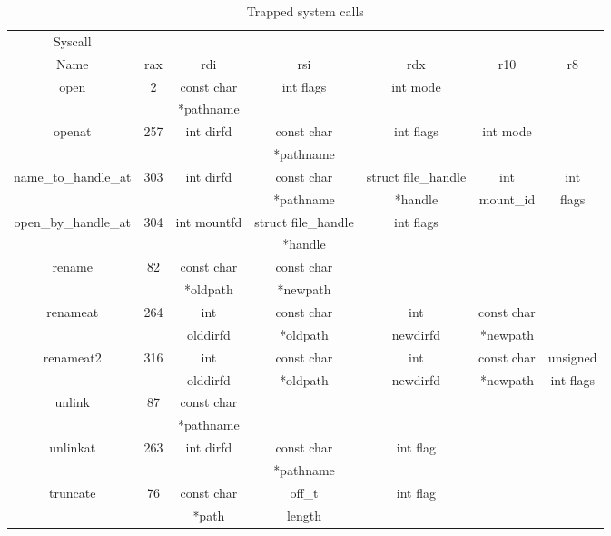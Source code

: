 \begin{table}[h]
	\centering
	\footnotesize
	\caption{Trapped system calls}
	\label{tbl:prototypes}
	\begin{tabular}{ccccccc}
		\toprule
		Syscall 				&           	&  				& 						&  						&  					&   		\\
		Name 					& rax		  	& rdi 			& rsi 					& rdx 					& r10 				& r8 		\\
		\toprule
		open 					& 2 			&	const char	&	int flags			&	int mode			&					&		 	\\
								&   			&	*pathname	&						&						&					&		 	\\
		\hline
		openat	 				& 257  			&	int dirfd	&	const char 			&	int flags			&	int mode		&	 		\\
								&   			&				&	*pathname			&						&					&		 	\\
		\hline
		name\_to\_handle\_at 	& 303  			&	int dirfd	&	const char			&	struct file\_handle	&	int				&	int	 	\\
								&   			&				&	*pathname			&	*handle				&	mount\_id		&	flags 	\\
		\hline
		open\_by\_handle\_at 	& 304  			&	int mountfd	&	struct file\_handle	&	int	flags			&					&		 	\\
								&   			&				&	*handle				&						&					&		 	\\
		\hline
		rename 					& 82  			&	const char	&	const char			&						&	 				&		 	\\
								&   			&	*oldpath	&	*newpath			&						&					&			\\
		\hline
		renameat 				& 264  			&	int 		&	const char 			&	int 				&	const char 		&	 		\\
								&   			&	olddirfd	&	*oldpath			&	newdirfd			&	*newpath		& 			\\ 
		\hline
		renameat2 				& 316  			&	int			&	const char 			&	int 				&	const char 		&	unsigned\\
								&   			&	olddirfd	&	*oldpath			&	newdirfd			&	*newpath		& 	int flags\\ 
		\hline
		unlink 					& 87  			&	const char	&						&						&					&		 	\\
								&   			&	*pathname	&						&						&					&		 	\\ 
		\hline
		unlinkat 				& 263  			&	int dirfd	&	const char			&	int flag			&					&		 	\\
								&   			&				&	*pathname			&						&					&		 	\\
		\hline
		truncate 				& 76  			&	const char	&	off\_t				&	int flag			&					&		 	\\
								&   			&		*path	&	length				&						&					&		 	\\
		\bottomrule
	\end{tabular}	
\end{table}

